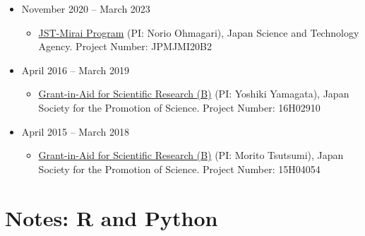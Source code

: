\documentclass[
]{book}
\providecommand{\tightlist}{%
  \setlength{\itemsep}{0pt}\setlength{\parskip}{0pt}}
\begin{document}
\begin{itemize}
\tightlist
\item
  November 2020 -- March 2023

  \begin{itemize}
  \tightlist
  \item
    \href{https://projectdb.jst.go.jp/grant/JST-PROJECT-20349885/}{JST-Mirai Program} (PI: Norio Ohmagari),
    Japan Science and Technology Agency.
    Project Number: JPMJMI20B2
  \end{itemize}
\item
  April 2016 -- March 2019

  \begin{itemize}
  \tightlist
  \item
    \href{https://kaken.nii.ac.jp/en/grant/KAKENHI-PROJECT-16H02910/}{Grant-in-Aid for Scientific Research (B)} (PI: Yoshiki Yamagata),
    Japan Society for the Promotion of Science.
    Project Number: 16H02910
  \end{itemize}
\item
  April 2015 -- March 2018

  \begin{itemize}
  \tightlist
  \item
    \href{https://kaken.nii.ac.jp/en/grant/KAKENHI-PROJECT-15H04054/}{Grant-in-Aid for Scientific Research (B)} (PI: Morito Tsutsumi),
    Japan Society for the Promotion of Science.
    Project Number: 15H04054
  \end{itemize}
\end{itemize}

\chapter*{Notes: R and Python}\label{notes-r-and-python}
\end{document}

